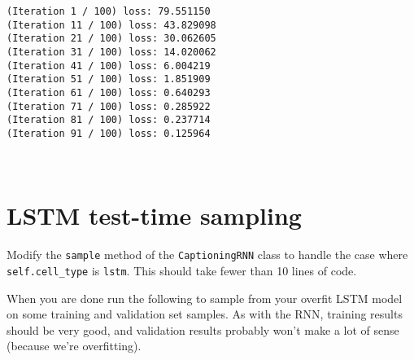 \documentclass[11pt]{article}
\begin{document}
    \begin{Verbatim}[commandchars=\\\{\}]
(Iteration 1 / 100) loss: 79.551150
(Iteration 11 / 100) loss: 43.829098
(Iteration 21 / 100) loss: 30.062605
(Iteration 31 / 100) loss: 14.020062
(Iteration 41 / 100) loss: 6.004219
(Iteration 51 / 100) loss: 1.851909
(Iteration 61 / 100) loss: 0.640293
(Iteration 71 / 100) loss: 0.285922
(Iteration 81 / 100) loss: 0.237714
(Iteration 91 / 100) loss: 0.125964

    \end{Verbatim}

    \begin{center}
    \end{center}
    { \hspace*{\fill} \\}
    
    \section{LSTM test-time sampling}\label{lstm-test-time-sampling}

Modify the \texttt{sample} method of the \texttt{CaptioningRNN} class to
handle the case where \texttt{self.cell\_type} is \texttt{lstm}. This
should take fewer than 10 lines of code.

When you are done run the following to sample from your overfit LSTM
model on some training and validation set samples. As with the RNN,
training results should be very good, and validation results probably
won't make a lot of sense (because we're overfitting).
\end{document}
